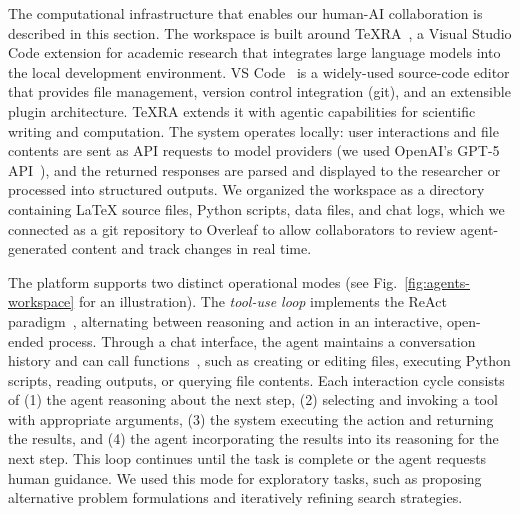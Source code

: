 \documentclass[pdflatex,sn-nature]{sn-jnl}%
\theoremstyle{thmstyleone}%
\theoremstyle{thmstyletwo}%
\theoremstyle{thmstylethree}%
\begin{document}
The computational infrastructure that enables our human-AI collaboration is described in this section. The workspace is built around TeXRA~\cite{Texra2025TeXRA}, a Visual Studio Code extension for academic research that integrates large language models into the local development environment. VS Code~\cite{VSCode} is a widely-used source-code editor that provides file management, version control integration (git), and an extensible plugin architecture. TeXRA extends it with agentic capabilities for scientific writing and computation. The system operates locally: user interactions and file contents are sent as API requests to model providers (we used OpenAI's GPT-5 API~\cite{Openai2025GPT}), and the returned responses are parsed and displayed to the researcher or processed into structured outputs. We organized the workspace as a directory containing LaTeX source files, Python scripts, data files, and chat logs, which we connected as a git repository to Overleaf to allow collaborators to review agent-generated content and track changes in real time.

The platform supports two distinct operational modes (see Fig.~\ref{fig:agents-workspace} for an illustration). The \emph{tool-use loop} implements the ReAct paradigm~\cite{Yao2023ReAct}, alternating between reasoning and action in an interactive, open-ended process. Through a chat interface, the agent maintains a conversation history and can call functions~\cite{Schick2023Toolformer}, such as creating or editing files, executing Python scripts, reading outputs, or querying file contents. Each interaction cycle consists of (1) the agent reasoning about the next step, (2) selecting and invoking a tool with appropriate arguments, (3) the system executing the action and returning the results, and (4) the agent incorporating the results into its reasoning for the next step. This loop continues until the task is complete or the agent requests human guidance. We used this mode for exploratory tasks, such as proposing alternative problem formulations and iteratively refining search strategies.
\end{document}
